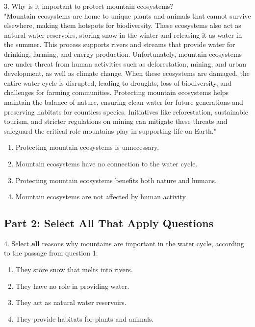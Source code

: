 \documentclass[12pt]{article}
\begin{document}
3. Why is it important to protect mountain ecosystems?\\
"Mountain ecosystems are home to unique plants and animals that cannot survive elsewhere, making them hotspots for biodiversity. These ecosystems also act as natural water reservoirs, storing snow in the winter and releasing it as water in the summer. This process supports rivers and streams that provide water for drinking, farming, and energy production. Unfortunately, mountain ecosystems are under threat from human activities such as deforestation, mining, and urban development, as well as climate change. When these ecosystems are damaged, the entire water cycle is disrupted, leading to droughts, loss of biodiversity, and challenges for farming communities. Protecting mountain ecosystems helps maintain the balance of nature, ensuring clean water for future generations and preserving habitats for countless species. Initiatives like reforestation, sustainable tourism, and stricter regulations on mining can mitigate these threats and safeguard the critical role mountains play in supporting life on Earth."\\
\begin{enumerate}[label=\Alph*.]
    \item Protecting mountain ecosystems is unnecessary.  
    \item Mountain ecosystems have no connection to the water cycle.  
    \item Protecting mountain ecosystems benefits both nature and humans.  
    \item Mountain ecosystems are not affected by human activity.  
\end{enumerate}

\vspace{1cm}

\subsection*{Part 2: Select All That Apply Questions}

4. Select \textbf{all} reasons why mountains are important in the water cycle, according to the passage from question 1:\\
\begin{enumerate}[label=\Alph*.]
    \item They store snow that melts into rivers.  
    \item They have no role in providing water.  
    \item They act as natural water reservoirs.  
    \item They provide habitats for plants and animals.  
\end{enumerate}
\end{document}
